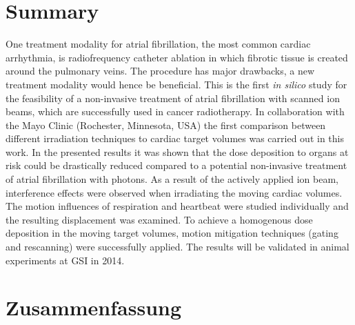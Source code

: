 % 
% 


% 


\section*{Summary}

One treatment modality for atrial fibrillation, the most common cardiac arrhythmia, is radiofrequency catheter ablation in which 
fibrotic tissue is created around the pulmonary veins. The procedure has major drawbacks, a new treatment modality would hence be beneficial.
This is the first \textit{in silico} study for the feasibility of a non-invasive treatment of atrial fibrillation with 
scanned ion beams, which are successfully used in cancer radiotherapy. 
In collaboration with the Mayo Clinic (Rochester, Minnesota, USA) the first comparison between different irradiation techniques to cardiac 
target volumes was carried out in this work. In the presented results it was shown that the dose deposition to organs at 
risk could be drastically reduced compared to a potential non-invasive treatment of atrial fibrillation with photons. 
As a result of the actively applied ion beam, interference effects were observed when irradiating the moving cardiac volumes. 
The motion influences of respiration and heartbeat were studied individually and the resulting displacement was examined. 
To achieve a homogenous dose deposition in the moving target volumes, motion mitigation techniques (gating and rescanning) 
were successfully applied. The results will be validated in animal experiments at GSI in 2014. 


\section*{Zusammenfassung}

